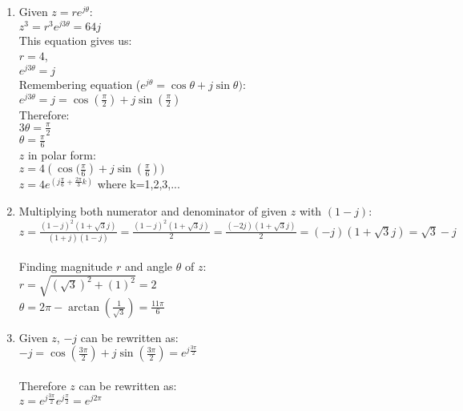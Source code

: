\documentclass[10pt,a4paper, margin=1in]{article}
\begin{document}
\begin{enumerate}
\begin{enumerate}
    \item
    Given $z = re^{j \theta }$: \\
    $z^3 = r^3e^{j3 \theta} = 64j$ \\
    This equation gives us: \\
    $r = 4$, \\
    $e^{j3 \theta } = j$ \\
    Remembering equation ($e^{j \theta } = \cos{ \theta } + j \sin{ \theta })$: \\
    $e^{j3 \theta } = j = \cos{( \frac{ \pi }{2})} + j \sin{(\frac{ \pi }{2})}$ \\
    Therefore: \\
    $3 \theta = \frac{ \pi }{2}$ \\
    $ \theta = \frac{ \pi }{6}$ \\
    $z$ in polar form: \\
    $z = 4( \cos{( \frac{ \pi }{6}}) + j \sin{( \frac{ \pi }{6})})$ \\
    $z = 4e^{(j\frac{ \pi }{6} + \frac{2 \pi }{3} k)}$ where k=1,2,3,... \\
    \item
    Multiplying both numerator and denominator of given $z$ with $(1 - j)$: \\
    $z = \frac{(1 - j)^2(1 + \sqrt{3}j)}{(1 + j)(1 - j)} = \frac{(1 - j)^2(1 + \sqrt{3}j)}{2} = \frac{(-2j)(1 + \sqrt{3}j)}{2} = (-j)(1 + \sqrt{3}j) = \sqrt{3} - j$ \\
    \\
    Finding magnitude $r$ and angle $ \theta $ of $z$: \\
    $r = \sqrt{( \sqrt{3})^2 + (1)^2} = 2$ \\
    $ \theta = 2 \pi - \arctan{( \frac{1}{\sqrt{3}} )} = \frac{11 \pi }{6}$ \\
    \item
    Given $z$, $-j$ can be rewritten as: \\
    $-j = \cos{( \frac{3 \pi }{2})} + j \sin{( \frac{3 \pi }{2})} = e^{j \frac{3 \pi }{2}}$ \\
    \\
    Therefore $z$ can be rewritten as: \\
    $z = e^{j \frac{3 \pi }{2}} e^{j \frac{ \pi }{2}} = e^{j 2 \pi }$ \\
    \end{enumerate}



\end{enumerate}
\end{document}
